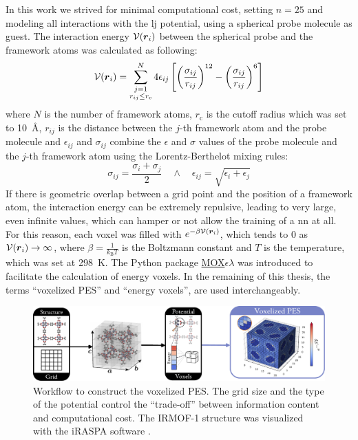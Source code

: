 In this work we strived for minimal computational cost, setting $n=25$ and
modeling all interactions with the \gls{lj} potential, using a spherical probe molecule as guest.
The interaction energy $\mathcal{V}(\boldsymbol{r}_i)$ between the spherical probe and the
framework atoms was calculated as following:
\begin{equation}
	\label{eq:lj_potential}
	\mathcal{V}(\boldsymbol{r}_i) =
	\sum_{\substack{j=1 \\ r_{ij} \leq r_\mathrm{c}}}^N 4\epsilon_{ij}
	\left[
		\left(\frac{\sigma_{ij}}{r_{ij}}\right)^{12}
		- 
		\left(\frac{\sigma_{ij}}{r_{ij}}\right)^{6}
	\right]
\end{equation}
where $N$ is the number of framework atoms, $r_\mathrm{c}$ is the cutoff
radius which was set to \SI{10}{\angstrom}, $r_{ij}$ is the
distance between the $j$-th framework atom and the probe molecule and
$\epsilon_{ij}$ and $\sigma_{ij}$ combine the $\epsilon$ and $\sigma$ values of
the probe molecule and the $j$-th framework atom using the Lorentz-Berthelot
mixing rules:
\begin{equation}
	\sigma_{ij} = \frac{\sigma_i + \sigma_j}{2}
	\quad
	\land
	\quad
	\epsilon_{ij} = \sqrt{\epsilon_i + \epsilon_j}
\end{equation}
If there is geometric overlap between a grid point and the position of a
framework atom, the interaction energy can be extremely repulsive, leading to
very large, even infinite values, which can hamper or not allow the training of
a \gls{nn} at all. For this reason, each voxel was filled with
$e^{-\beta\mathcal{V}(\boldsymbol{r}_i)}$, which tends to \num{0} as $\mathcal{V}(\boldsymbol{r}_i) \to
\infty$, where $\beta = \frac{1}{k_\mathrm{B}T}$ is the Boltzmann
constant and $T$ is the
temperature, which was set at \SI{298}{\kelvin}. The Python
package
\href{https://github.com/frudakis-research-group/moxel}{MOX$\epsilon\lambda$}
was introduced to facilitate the calculation of energy voxels. In the remaining
of this thesis, the terms ``voxelized PES'' and ``energy voxels'', are used interchangeably.

\begin{figure}
	\centering
	\includegraphics[width=\textwidth]{fig/voxelized_pes.pdf}
	\caption[Workflow to construct the voxelized PES.]{Workflow to construct the
	voxelized PES. The grid size and the type of the potential control the
	``trade-off'' between information content and computational cost. The
	IRMOF-1 structure was visualized with the iRASPA software
	\parencite{Dubbeldam2018}.}
	\label{fig:voxelized_pes}
\end{figure}

